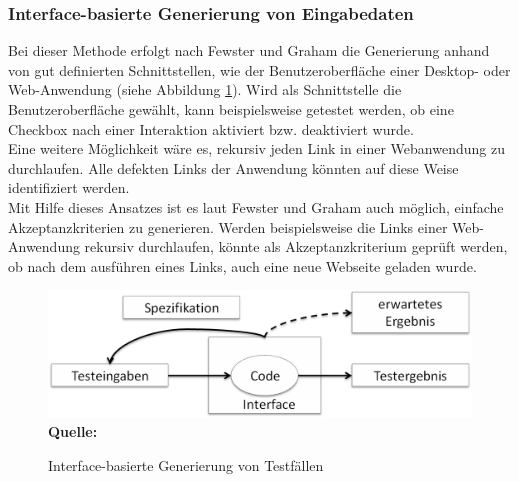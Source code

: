\subsubsection{Interface-basierte Generierung von Eingabedaten}
\label{subsubsec:interfacebasierte_generierung}
Bei dieser Methode erfolgt nach Fewster und Graham \cite[vgl. S. 20]{fewster_software_1999} die Generierung anhand von gut definierten Schnittstellen, wie der Benutzeroberfläche einer Desktop- oder Web-Anwendung (siehe Abbildung \ref{fig:interfaceBasedDesign}). 
Wird als Schnittstelle die Benutzeroberfläche gewählt, kann beispielsweise getestet werden, ob eine Checkbox nach einer Interaktion aktiviert bzw. deaktiviert wurde.\\
Eine weitere Möglichkeit wäre es, rekursiv jeden Link in einer Webanwendung zu durchlaufen. Alle defekten Links der Anwendung könnten auf diese Weise identifiziert werden.\\
Mit Hilfe dieses Ansatzes ist es laut Fewster und Graham \cite[vgl. S. 21]{fewster_software_1999} auch möglich, einfache Akzeptanzkriterien zu generieren. Werden beispielsweise die Links einer Web-Anwendung rekursiv durchlaufen, könnte als Akzeptanzkriterium geprüft werden, ob nach dem ausführen eines Links, auch eine neue Webseite geladen wurde.

\begin{figure}[htb]
  \centering  
  \includegraphics[scale=0.6]{img/interfaceBasedDesign.png}\\
  \footnotesize\sffamily\textbf{Quelle:} \cite[vgl. S. 20]{fewster_software_1999}
  \caption{Interface-basierte Generierung von Testfällen}
  \label{fig:interfaceBasedDesign}
\end{figure}


